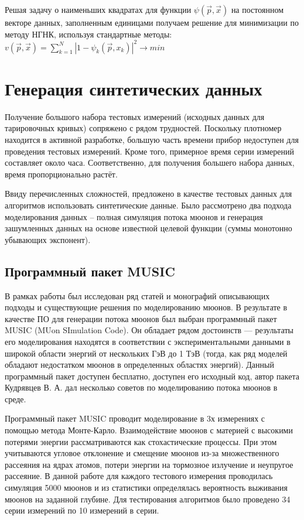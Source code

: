 Решая задачу о наименьших квадратах для функции 
$\psi(\vec{p}, \vec{x})$ на постоянном векторе данных, заполненным
единицами получаем решение для минимизации по методу НГНК, используя стандартные методы: 
$v(\vec{p}, \vec{x}) = \displaystyle\sum_{k=1}^N \left|1 -
\psi_k(\vec{p}, x_k)\right|^2 \rightarrow min$


\section{Генерация синтетических данных}\label{sect2_3}


Получение большого набора тестовых измерений (исходных данных 
для тарировочных кривых) сопряжено с рядом трудностей. Поскольку 
плотномер находится в активной разработке,
большую часть времени прибор недоступен для проведения тестовых
измерений. Кроме того, примерное время серии измерений составляет
около часа. Соответственно, для получения большего набора данных, время пропорционально растёт.


Ввиду перечисленных сложностей, предложено в качестве тестовых
данных для алгоритмов использовать синтетические данные. Было 
рассмотрено два подхода моделирования данных -- 
полная симуляция потока мюонов и генерация зашумленных данных 
на основе известной целевой функции (суммы монотонно убывающих экспонент).


\subsection{Программный пакет MUSIC}\label{subsect2_3_1}

В рамках работы был исследован ряд статей и монографий описывающих подходы и существующие
решения по моделированию мюонов. В результате в качестве ПО для 
генерации потока мюонов
был выбран программный пакет MUSIC (MUon SImulation Code). Он обладает
рядом достоинств --- 
результаты его моделирования находятся в соответствии с экспериментальными
данными в широкой области энергий от нескольких ГэВ до 1 ТэВ (тогда, как ряд
моделей обладают
недостатком мюонов в определенных областях энергий). Данный программный 
пакет доступен бесплатно, доступен его исходный код, автор пакета
Кудрявцев В. А. \cite{kudryavcev} дал несколько 
советов по моделированию потока мюонов в среде.


Программный пакет MUSIC проводит моделирование в 3х измерениях с помощью 
метода Монте-Карло. Взаимодействие мюонов с материей с высокими
потерями энергии рассматриваются как стохастические процессы. При этом учитываются угловое отклонение 
и смещение мюонов из-за множественного рассеяния на ядрах атомов, 
потери энергии на тормозное излучение
и неупругое рассеяние. В данной работе для каждого тестового измерения 
проводилась симуляция 5000 мюонов и из статистики определялась вероятность
выживания мюонов на заданной глубине. 
Для тестирования алгоритмов было проведено 34 серии измерений по 10 измерений в серии. 


